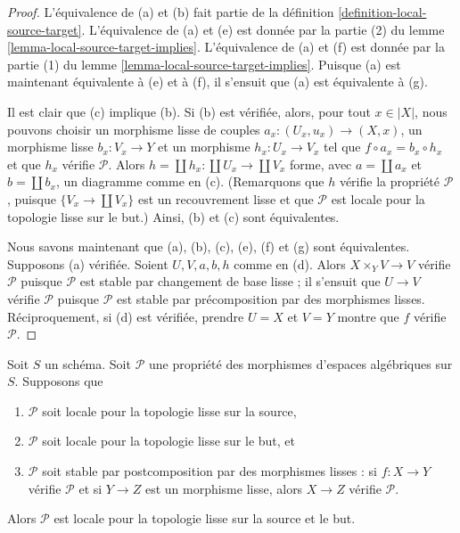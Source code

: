 \begin{proof}
L'équivalence de (a) et (b) fait partie de la
définition \ref{definition-local-source-target}.
L'équivalence de (a) et (e) est donnée par la
partie (2) du lemme \ref{lemma-local-source-target-implies}.
L'équivalence de (a) et (f) est donnée par la
partie (1) du lemme \ref{lemma-local-source-target-implies}.
Puisque (a) est maintenant équivalente à (e) et à (f), il s'ensuit que
(a) est équivalente à (g).

\medskip\noindent
Il est clair que (c) implique (b). Si (b) est vérifiée, alors, pour tout
$x \in |X|$, nous pouvons choisir un morphisme lisse de couples
$a_x : (U_x, u_x) \to (X, x)$, un morphisme lisse $b_x : V_x \to Y$ et
un morphisme $h_x : U_x \to V_x$ tel que $f \circ a_x = b_x \circ h_x$ et que
$h_x$ vérifie $\mathcal{P}$. Alors $h = \coprod h_x : \coprod U_x \to \coprod V_x$
forme, avec $a = \coprod a_x$ et $b = \coprod b_x$, un diagramme comme en (c).
(Remarquons que $h$ vérifie la propriété $\mathcal{P}$, puisque $\{V_x \to \coprod V_x\}$
est un recouvrement lisse et que $\mathcal{P}$ est locale pour la topologie lisse sur le but.)
Ainsi, (b) et (c) sont équivalentes.

\medskip\noindent
Nous savons maintenant que (a), (b), (c), (e), (f) et (g) sont équivalentes.
Supposons (a) vérifiée. Soient $U, V, a, b, h$ comme en (d). Alors
$X \times_Y V \to V$ vérifie $\mathcal{P}$ puisque $\mathcal{P}$ est stable par
changement de base lisse ; il s'ensuit que $U \to V$ vérifie $\mathcal{P}$ puisque $\mathcal{P}$
est stable par précomposition par des morphismes lisses. Réciproquement, si (d)
est vérifiée, prendre $U = X$ et $V = Y$ montre que $f$ vérifie $\mathcal{P}$.
\end{proof}

\begin{lemma}
\label{lemma-smooth-local-source-target}
Soit $S$ un schéma.
Soit $\mathcal{P}$ une propriété des morphismes d'espaces algébriques sur $S$.
Supposons que
\begin{enumerate}
\item $\mathcal{P}$ soit locale pour la topologie lisse sur la source,
\item $\mathcal{P}$ soit locale pour la topologie lisse sur le but, et
\item $\mathcal{P}$ soit stable par postcomposition par des morphismes lisses :
si $f : X \to Y$ vérifie $\mathcal{P}$ et si $Y \to Z$ est un morphisme lisse,
alors $X \to Z$ vérifie $\mathcal{P}$.
\end{enumerate}
Alors $\mathcal{P}$ est locale pour la topologie lisse sur la source et le but.
\end{lemma}

